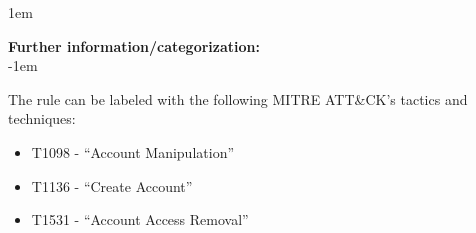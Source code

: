 \openup 1em

{\bf Further information/categorization:} \\

\openup -1em
\vspace{-2em}


The rule can be labeled with the following MITRE ATT\&CK's tactics and techniques:
\begin{itemize}
	\item T1098 - ``Account Manipulation''
	\item T1136 - ``Create Account''
	\item T1531 - ``Account Access Removal''
\end{itemize}

\pagebreak

